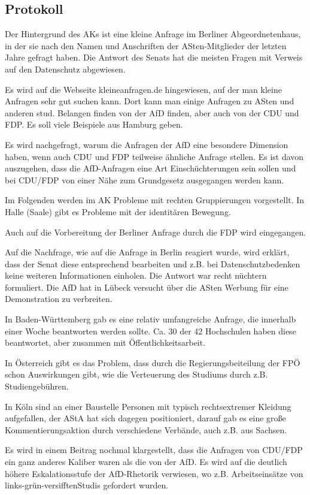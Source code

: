   \subsection*{Protokoll}
Der Hintergrund des AKs ist eine kleine Anfrage im Berliner Abgeordnetenhaus, in der sie nach den Namen und Anschriften der ASten-Mitglieder der letzten Jahre gefragt haben. Die Antwort des Senats hat die meisten Fragen mit Verweis auf den Datenschutz abgewiesen.

Es wird auf die Webseite kleineanfragen.de hingewiesen, auf der man kleine Anfragen sehr gut suchen kann. Dort kann man einige Anfragen zu ASten und anderen stud. Belangen finden von der AfD finden, aber auch von der CDU und FDP. Es soll viele Beispiele aus Hamburg geben. 

Es wird nachgefragt, warum die Anfragen der AfD eine besondere Dimension haben, wenn auch CDU und FDP teilweise ähnliche Anfrage stellen. Es ist davon auszugehen, dass die AfD-Anfragen eine Art Einschüchterungen sein sollen und bei CDU/FDP von einer Nähe zum Grundgesetz ausgegangen werden kann. 

Im Folgenden werden im AK Probleme mit rechten Gruppierungen vorgestellt. 
In Halle (Saale) gibt es Probleme mit der identitären Bewegung. 

Auch auf die Vorbereitung der Berliner Anfrage durch die FDP wird eingegangen. 

Auf die Nachfrage, wie auf die Anfrage in Berlin reagiert wurde, wird erklärt, dass der Senat diese entsprechend bearbeiten und z.B. bei Datenschutzbedenken keine weiteren Informationen einholen. Die Antwort war recht nüchtern formuliert. Die AfD hat in Lübeck versucht über die ASten Werbung für eine Demonstration zu verbreiten. 

In Baden-Württemberg gab es eine relativ umfangreiche Anfrage, die innerhalb einer Woche beantworten werden sollte. Ca. 30 der 42 Hochschulen haben diese beantwortet, aber zusammen mit Öffentlichkeitsarbeit. 

In Österreich gibt es das Problem, dass durch die Regierungsbeiteilung der FPÖ schon Auswirkungen gibt, wie die Verteuerung des Studiums durch z.B. Studiengebühren. 

In Köln sind an einer Baustelle Personen mit typisch rechtsextremer Kleidung aufgefallen, der AStA hat sich dagegen positioniert, darauf gab es eine große Kommentierungsaktion durch verschiedene Verbände, auch z.B. aus Sachsen.

Es wird in einem Beitrag nochmal klargestellt, dass die Anfragen von CDU/FDP ein ganz anderes Kaliber waren als die von der AfD. Es wird auf die deutlich höhere Eskalationsstufe der AfD-Rhetorik verwiesen, wo z.B. Arbeitseinsätze von \flqq links-grün-versifften\frqq Studis gefordert wurden. 

